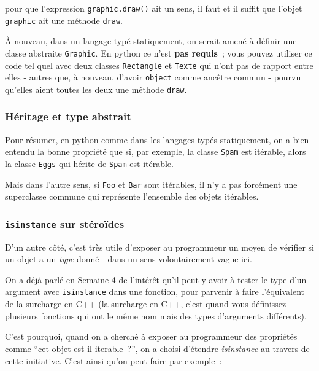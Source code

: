 pour que l'expression \texttt{graphic.draw()} ait un sens, il faut et il
suffit que l'objet \texttt{graphic} ait une méthode \texttt{draw}.

    À nouveau, dans un langage typé statiquement, on serait amené à définir
une classe abstraite \texttt{Graphic}. En python ce n'est \textbf{pas
requis}~; vous pouvez utiliser ce code tel quel avec deux classes
\texttt{Rectangle} et \texttt{Texte} qui n'ont pas de rapport entre
elles - autres que, à nouveau, d'avoir \texttt{object} comme ancêtre
commun - pourvu qu'elles aient toutes les deux une méthode
\texttt{draw}.

    \hypertarget{huxe9ritage-et-type-abstrait}{%
\subsubsection{Héritage et type
abstrait}\label{huxe9ritage-et-type-abstrait}}

    Pour résumer, en python comme dans les langages typés statiquement, on a
bien entendu la bonne propriété que si, par exemple, la classe
\texttt{Spam} est itérable, alors la classe \texttt{Eggs} qui hérite de
\texttt{Spam} est itérable.

Mais dans l'autre sens, si \texttt{Foo} et \texttt{Bar} sont itérables,
il n'y a pas forcément une superclasse commune qui représente l'ensemble
des objets itérables.

    \hypertarget{isinstance-sur-stuxe9rouxefdes}{%
\subsubsection{\texorpdfstring{\texttt{isinstance} sur
stéroïdes}{isinstance sur stéroïdes}}\label{isinstance-sur-stuxe9rouxefdes}}

    D'un autre côté, c'est très utile d'exposer au programmeur un moyen de
vérifier si un objet a un \emph{type} donné - dans un sens
volontairement vague ici.

On a déjà parlé en Semaine 4 de l'intérêt qu'il peut y avoir à tester le
type d'un argument avec \texttt{isinstance} dans une fonction, pour
parvenir à faire l'équivalent de la surcharge en C++ (la surcharge en
C++, c'est quand vous définissez plusieurs fonctions qui ont le même nom
mais des types d'arguments différents).

C'est pourquoi, quand on a cherché à exposer au programmeur des
propriétés comme ``cet objet est-il iterable~?'', on a choisi d'étendre
\emph{isinstance} au travers de
\href{http://legacy.python.org/dev/peps/pep-3119/}{cette initiative}.
C'est ainsi qu'on peut faire par exemple~:

